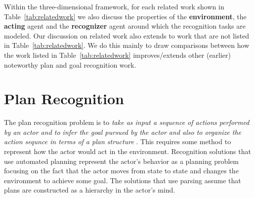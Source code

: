 \noindent Within the three-dimensional framework, for each related work shown in Table~\ref{tab:relatedwork} we also discuss the properties of the \textbf{environment}, the \textbf{acting} agent and the \textbf{recognizer} agent around which the recognition tasks are modeled. Our discussion on related work also extends to work that are not listed in Table~\ref{tab:relatedwork}. We do this mainly to draw comparisons between how the work listed in Table~\ref{tab:relatedwork} improves/extends other (earlier) noteworthy plan and goal recognition work.

\begin{table}[ht]
%
\caption{Fitting related work to the analysis framework}
\label{tab:relatedwork}
\end{table}

\section{Plan Recognition}
The plan recognition problem is to \textit{take as input a sequence of actions performed by an actor and to infer the  goal pursued by the actor and also to organize the action sequnce in terms of a plan structure} \cite{schmidt1978plan}. This requires some method to represent how the actor would act in the environment. Recognition solutions that use automated planning represent the actor's behavior as a planning problem focusing on the fact that the actor moves from state to state and changes the environment to achieve some goal. The solutions that use parsing assume that plans are constructed as a hierarchy in the actor's mind.

